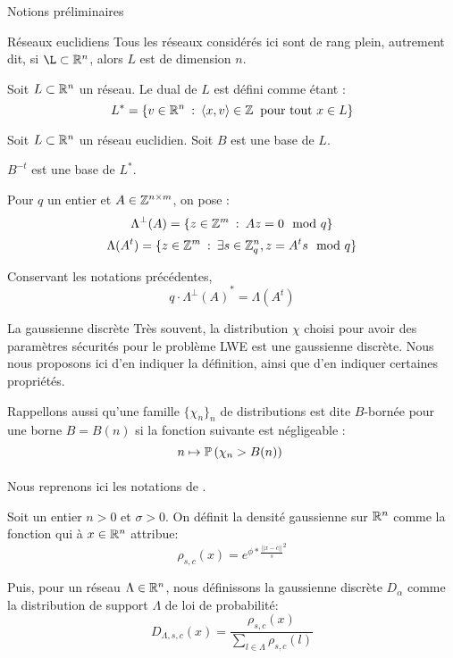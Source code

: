 \begin{section}{Notions préliminaires}
\begin{subsection}{Réseaux euclidiens}
	Tous les réseaux considérés ici sont de rang plein, autrement dit, si $\L \subset \RR^n$, alors $L$ est de dimension $n$.

	\begin{definition}
	Soit $L\subset \mathbb{R}^n$ un réseau. Le dual de $L$ est défini comme étant :
	\[ L^* = \{ v \in \mathbb{R}^n \::\: \langle x, v \rangle \in \mathbb{Z}
	   \:\text{ pour tout } x\in L\} \]
	\end{definition}
	\begin{prop} 
	Soit $L \subset \mathbb{R}^n$ un réseau euclidien. Soit $B$ est une base de $L$.
	
	$B^{-t}$ est une base de $L^*$.
	\end{prop}

	Pour $q$ un entier et $A \in \mathbb{Z}^{n\times m}$, on pose :
		\[\Lambda^\bot(A) = \{ z \in \mathbb{Z}^m\: :\: A z  = 0 \mod q \}\] 
	\[\Lambda(A^t) = \{ z \in \mathbb{Z}^m\: : \: \exists s\in \mathbb{Z}_q^n, z = A^t s \mod q\}\]

		\begin{prop} \label{lambda_reseau}
	Conservant les notations précédentes, 
	\[q \cdot {\Lambda^\bot(A)}^* =  \Lambda(A^t)\] 
	\end{prop}
	\end{subsection}
	
	\begin{subsection}{La gaussienne discrète}
	Très souvent, la distribution $\chi$ choisi pour avoir des paramètres sécurités pour le problème LWE est une gaussienne discrète. Nous nous proposons ici d'en indiquer la définition, ainsi que d'en indiquer certaines propriétés.

	Rappellons aussi qu'une famille $\{\chi_n\}_n$ de distributions est dite $B$-bornée pour une borne $B = B(n)$ si la fonction suivante est négligeable :
		\[n \mapsto \PP\left(\chi_n > B(n)\right) \]

	\paragraph{}
	Nous reprenons ici les notations de \cite{STOC:GenPeiVai08}.

	Soit un entier $n > 0$  et $\sigma > 0$. On définit la densité gaussienne sur $\mathbb{R}^n$ comme la fonction qui à $x\in\mathbb{R}^n$ attribue:
	\[\rho_{s,c}(x) = e^{\phi * {\frac{||x-c||}{s}}^2} \]

	Puis, pour un réseau $\Lambda \in \mathbb{R}^n$, nous définissons la gaussienne discrète $D_\alpha$ comme la distribution de support $\Lambda$ de loi de probabilité: 	
	\[ D_{\Lambda, s, c}(x) = \frac{\rho_{s,c}(x)}{\sum_{l\in \Lambda}\rho_{s,c}(l)}\]


\end{subsection}
\end{section}
